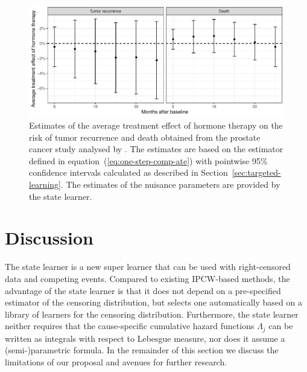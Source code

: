 \begin{figure}
  \centering%
  \includegraphics[width=1\linewidth]{real-data-target.pdf}
  \caption[]{Estimates of the average treatment effect of hormone therapy on the
    risk of tumor recurrence and death obtained from the prostate cancer study
    analysed by \cite{kattan2000pretreatment}. The estimates are based on the
    estimator defined in equation~(\ref{eq:one-step-comp-ate}) with pointwise
    95\% confidence intervals calculated as described in
    Section~\ref{sec:targeted-learning}. The estimates of the nuisance
    parameters are provided by the state learner.}
  \label{fig:zelefski-real-target}
\end{figure}



\section{Discussion}
\label{sec:discussion}

The state learner is a new super learner that can be used with
right-censored data and competing events. Compared to existing
IPCW-based methods, the advantage of the state learner is that it does
not depend on a pre-specified estimator of the censoring distribution,
but selects one automatically based on a library of learners for the
censoring distribution. Furthermore, the state learner neither
requires that the cause-specific cumulative hazard functions
\( \Lambda_j \) can be written as integrals with respect to Lebesgue
measure, nor does it assume a (semi-)parametric formula. In the
remainder of this section we discuss the limitations of our proposal
and avenues for further research.

